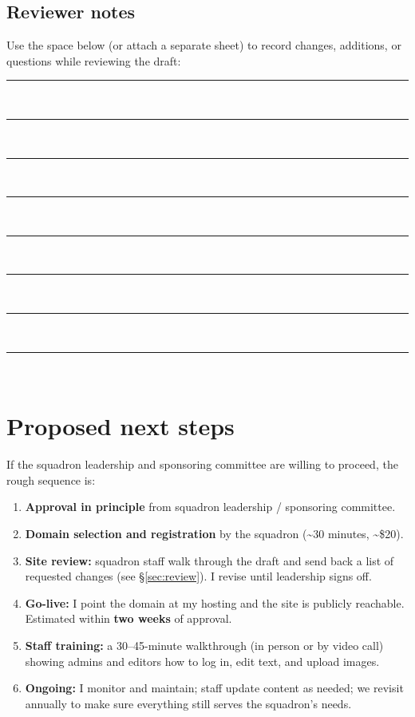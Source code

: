\documentclass[11pt,letterpaper]{article}
\begin{document}
\subsection*{Reviewer notes}
\noindent Use the space below (or attach a separate sheet) to record changes, additions, or questions while reviewing the draft:

\vspace{0.4em}
\rule{\linewidth}{0.4pt}\\[1.4em]
\rule{\linewidth}{0.4pt}\\[1.4em]
\rule{\linewidth}{0.4pt}\\[1.4em]
\rule{\linewidth}{0.4pt}\\[1.4em]
\rule{\linewidth}{0.4pt}\\[1.4em]
\rule{\linewidth}{0.4pt}\\[1.4em]
\rule{\linewidth}{0.4pt}\\[1.4em]
\rule{\linewidth}{0.4pt}\\[1.4em]

\section{Proposed next steps}

If the squadron leadership and sponsoring committee are willing to proceed, the rough sequence is:

\begin{enumerate}[leftmargin=1.6em,itemsep=0.25em]
  \item \textbf{Approval in principle} from squadron leadership / sponsoring committee.
  \item \textbf{Domain selection and registration} by the squadron (\textasciitilde{}30 minutes, \textasciitilde{}\$20).
  \item \textbf{Site review:} squadron staff walk through the draft and send back a list of requested changes (see \S\ref{sec:review}). I revise until leadership signs off.
  \item \textbf{Go-live:} I point the domain at my hosting and the site is publicly reachable. Estimated within \textbf{two weeks} of approval.
  \item \textbf{Staff training:} a 30--45-minute walkthrough (in person or by video call) showing admins and editors how to log in, edit text, and upload images.
  \item \textbf{Ongoing:} I monitor and maintain; staff update content as needed; we revisit annually to make sure everything still serves the squadron's needs.
\end{enumerate}
\end{document}
